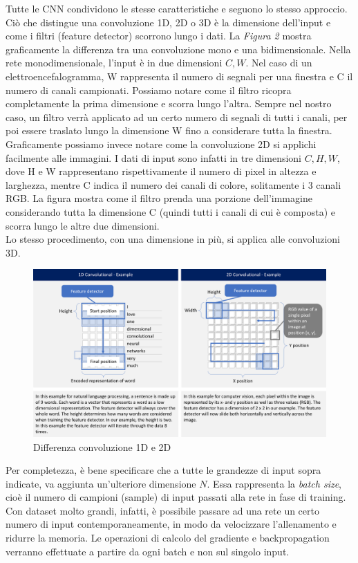 \documentclass{article}
\begin{document}
Tutte le CNN condividono le stesse caratteristiche e seguono lo stesso approccio. Ciò che distingue una convoluzione 1D, 2D o 3D è la dimensione dell'input e come i filtri (feature detector) scorrono lungo i dati. La \textit{Figura 2} mostra graficamente la differenza tra una convoluzione mono e una bidimensionale. Nella rete monodimensionale, l'input è in due dimensioni $C, W$. Nel caso di un elettroencefalogramma, W rappresenta il numero di segnali per una finestra e C il numero di canali campionati. Possiamo notare come il filtro ricopra completamente la prima dimensione e scorra lungo l'altra. Sempre nel nostro caso, un filtro verrà applicato ad un certo numero di segnali di tutti i canali, per poi essere traslato lungo la dimensione W fino a considerare tutta la finestra.\\
Graficamente possiamo invece notare come la convoluzione 2D si applichi facilmente alle immagini. I dati di input sono infatti in tre dimensioni $C, H, W$, dove H e W rappresentano rispettivamente il numero di pixel in altezza e larghezza, mentre C indica il numero dei canali di colore, solitamente i 3 canali RGB. La figura mostra come il filtro prenda una porzione dell'immagine considerando tutta la dimensione C (quindi tutti i canali di cui è composta) e scorra lungo le altre due dimensioni. \\
Lo stesso procedimento, con una dimensione in più, si applica alle convoluzioni 3D. 
\begin{figure}[!h]
\centering
\includegraphics[scale=0.2]{conv1d}
\caption{Differenza convoluzione 1D e 2D}
\end{figure}

Per completezza, è bene specificare che a tutte le grandezze di input sopra indicate, va aggiunta un'ulteriore dimensione $N$. Essa rappresenta la \textit{batch size}, cioè il numero di campioni (sample) di input passati alla rete in fase di training. Con dataset molto grandi, infatti, è possibile passare ad una rete un certo numero di input contemporaneamente, in modo da velocizzare l'allenamento e ridurre la memoria. Le operazioni di calcolo del gradiente e backpropagation verranno effettuate a partire da ogni batch e non sul singolo input. 
\end{document}
